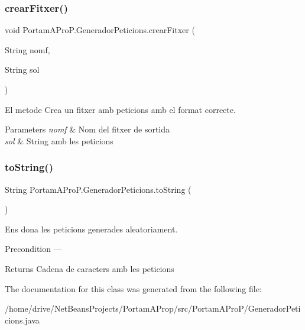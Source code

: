 \subsubsection{\texorpdfstring{crear\+Fitxer()}{crearFitxer()}}
{\footnotesize\ttfamily void Portam\+A\+Pro\+P.\+Generador\+Peticions.\+crear\+Fitxer (\begin{DoxyParamCaption}\item[{String}]{nomf,  }\item[{String}]{sol }\end{DoxyParamCaption})}



El metode Crea un fitxer amb peticions amb el format correcte. 


\begin{DoxyParams}{Parameters}
{\em nomf} & Nom del fitxer de sortida \\
\hline
{\em sol} & String amb les peticions \\
\hline
\end{DoxyParams}
\mbox{\label{class_portam_a_pro_p_1_1_generador_peticions_ad3f3aba087dac7be0bd212d86889ae7f}} 
\subsubsection{\texorpdfstring{to\+String()}{toString()}}
{\footnotesize\ttfamily String Portam\+A\+Pro\+P.\+Generador\+Peticions.\+to\+String (\begin{DoxyParamCaption}{ }\end{DoxyParamCaption})}



Ens dona les peticions generades aleatoriament. 

\begin{DoxyPrecond}{Precondition}
--- 
\end{DoxyPrecond}
\begin{DoxyReturn}{Returns}
Cadena de caracters amb les peticions 
\end{DoxyReturn}


The documentation for this class was generated from the following file\+:\begin{DoxyCompactItemize}
\item 
/home/drive/\+Net\+Beans\+Projects/\+Portam\+A\+Prop/src/\+Portam\+A\+Pro\+P/Generador\+Peticions.\+java\end{DoxyCompactItemize}

